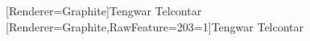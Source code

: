 \usepackage{fontspec}
\usepackage{polyglossia}
\usepackage{hyperref}
\usepackage{xspace}
\usepackage{widetable,tabularx,booktabs,multirow,multicol}

\newfontfamily{\telcontar}[Renderer=Graphite]{Tengwar Telcontar}
\newfontfamily{\telcontarcaps}[Renderer=Graphite,RawFeature={203=1}]{Tengwar
Telcontar}
\newcommand{\quetta}[1]{{\formal #1}}
\newcommand{\q}[1]{\quetta{#1}}
\newcommand{\qh}[1]{{\huge \q{#1}}}
\newcommand{\ql}[1]{{\Large \q{#1}}}
\newcommand{\qc}[1]{{\telcontarcaps #1}}
\renewcommand{\t}[1]{\textit{#1}}
\newcommand{\elvishtitle}[1]{{\Large\bfseries #1}}
\newenvironment{elvish}{\formal}{}

\newcommand{\quenya}{\q{}\xspace}


